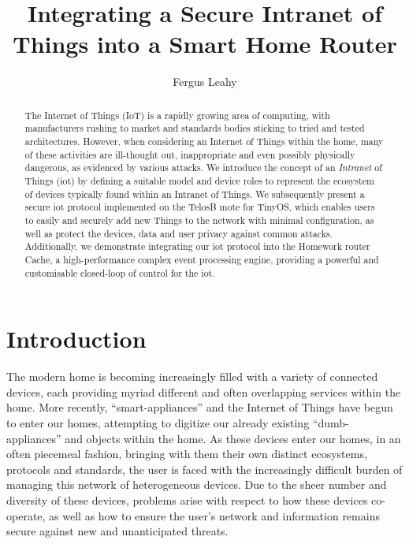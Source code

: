 \documentclass{mpaper}
\begin{document}
%
\title{Integrating a Secure Intranet of Things into a Smart Home Router}


\author{Fergus Leahy}

\maketitle


\begin{abstract}
The Internet of Things (IoT) is a rapidly growing area of computing, with manufacturers rushing to market and standards bodies sticking to tried and tested architectures. However, when considering an Internet of Things within the home, many of these activities are ill-thought out, inappropriate and even possibly physically dangerous, as evidenced by various attacks\cite{BelkinWemo,IoTWorm}. We introduce the concept of an \textit{Intranet} of Things (iot) by defining a suitable model and device roles to represent the ecosystem of devices typically found within an Intranet of Things. We subsequently present a secure iot protocol implemented on the TelosB mote for TinyOS, which enables users to easily and securely add new Things to the network with minimal configuration, as well as protect the devices, data and user privacy against common attacks. Additionally, we demonstrate integrating our iot protocol into the Homework router Cache, a high-performance complex event processing engine, providing a powerful and customisable closed-loop of control for the iot.
\end{abstract}


\section{Introduction}
\label{sec:introduction}
The modern home is becoming increasingly filled with a variety of connected devices, each providing myriad different and often overlapping services within the home. More recently, ``smart-appliances'' and the Internet of Things have begun to enter our homes, attempting to digitize our already existing ``dumb-appliances'' and objects within the home. As these devices enter our homes, in an often piecemeal fashion, bringing with them their own distinct ecosystems, protocols and standards, the user is faced with the increasingly difficult burden of managing this network of heterogeneous devices. Due to the sheer number and diversity of these devices, problems arise with respect to how these devices co-operate, as well as how to ensure the user's network and information remains secure against new and unanticipated threats.
\end{document}
